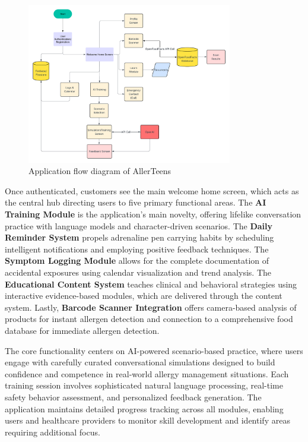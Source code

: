 \documentclass[MScCS]{uccthesis}
\begin{document}
\begin{figure}[htbp]
    \centering
    \includegraphics[width=0.8\textwidth,height=0.65\textheight,keepaspectratio]{Figures/application_flow_diagram.png}
    \caption{Application flow diagram of AllerTeens}
    \label{fig:application_flow_diagram}
\end{figure}

Once authenticated, customers see the main welcome home screen, which acts as the central hub directing users to five primary functional areas. The \textbf{AI Training Module} is the application's main novelty, offering lifelike conversation practice with language models and character-driven scenarios. The \textbf{Daily Reminder System} propels adrenaline pen carrying habits by scheduling intelligent notifications and employing positive feedback techniques. The \textbf{Symptom Logging Module} allows for the complete documentation of accidental exposures using calendar visualization and trend analysis. The \textbf{Educational Content System} teaches clinical and behavioral strategies using interactive evidence-based modules, which are delivered through the content system. Lastly, \textbf{Barcode Scanner Integration} offers camera-based analysis of products for instant allergen detection and connection to a comprehensive food database for immediate allergen detection.

The core functionality centers on AI-powered scenario-based practice, where users engage with carefully curated conversational simulations designed to build confidence and competence in real-world allergy management situations. Each training session involves sophisticated natural language processing, real-time safety behavior assessment, and personalized feedback generation. The application maintains detailed progress tracking across all modules, enabling users and healthcare providers to monitor skill development and identify areas requiring additional focus.
\end{document}

